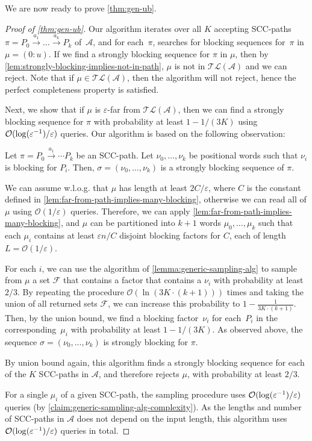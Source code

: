 \documentclass[letterpaper, USenglish, cleveref, autoref, thm-restate, numberwithinsect]{lipics-v2021}
\theoremstyle{theorem}
\theoremstyle{definition}
\newcommand{\Aa}{\mathcal{A}}
\newcommand{\cO}{\mathcal{O}}
\newcommand{\eps}{\varepsilon}
\newcommand{\Ff}{\mathcal{F}}
\newcommand{\SCCpath}{\pi}
\newcommand{\timedlang}[1]{\mathcal{TL}( #1 )}
\newcommand{\timedword}[2]{(#1:#2)}
\newcommand{\twu}{\timedword{0}{u}}
\newcommand{\epslogeps}[1][]
{\ifthenelse{\equal{#1}{}}{\log(\eps^{-1})/\eps}{\log^{ #1 }(\eps^{-1})/\eps}}
\begin{document}
We are now ready to prove \cref{thm:gen-ub}.
\begin{proof}[Proof of \cref{thm:gen-ub}]
	Our algorithm iterates over all $K$ accepting SCC-paths~$\SCCpath = P_0\xrightarrow{a_1}\ldots\xrightarrow{a_k} P_k$ of~$\Aa$, and for each~$\SCCpath$, searches for blocking sequences for~$\SCCpath$ in $\mu = \twu$.
	If we find a strongly blocking sequence for $\SCCpath$ in $\mu$, then by \cref{lem:strongly-blocking-implies-not-in-path}, $\mu$ is not in $\timedlang{\Aa}$ and we can reject.
	Note that if $\mu\in\timedlang{\Aa}$, then the algorithm will not reject, hence the perfect completeness property is satisfied.

	Next, we show that if $\mu$ is $\eps$-far from $\timedlang{\Aa}$, then we can find a strongly blocking sequence for $\SCCpath$ with probability at least $1 - 1/(3K)$ using $\cO(\epslogeps)$ queries.
	Our algorithm is based on the following observation:
	\begin{observation}\label{obs:sbs-from-disj-factors}
		Let $\SCCpath  = P_0 \xrightarrow{a_1} \cdots  P_k$ be an SCC-path.
		Let $\nu_0, \ldots, \nu_k$ be positional words such that $\nu_i$ is blocking for $P_i$.
		Then, $\sigma = (\nu_0, \ldots, \nu_k)$ is a strongly blocking sequence of $\SCCpath$.
	\end{observation}

	We can assume w.l.o.g. that $\mu$ has length at least $2C/\eps$, where $C$ is the constant defined in \cref{lem:far-from-path-implies-many-blocking}, otherwise we can read all of $\mu$ using $\cO(1/\eps)$ queries.
	Therefore, we can apply \cref{lem:far-from-path-implies-many-blocking}, and $\mu$ can be partitioned into $k+1$ words $\mu_0,\ldots,\mu_k$ such that each $\mu_i$ contains at least $\eps n/C$ disjoint blocking factors for $C$, each of length $L = \cO(1/\eps)$.

	For each $i$, we can use the algorithm of \cref{lemma:generic-sampling-alg} to sample from $\mu$ a set $\Ff$ that contains a factor that contains a $\nu_i$ with probability at least $2/3$.
	By repeating the procedure $\cO(\ln(3K\cdot (k+1)))$ times and taking the union of all returned sets $\Ff$, we can increase this probability to $1 - \frac{1}{3K\cdot (k+1)}$.
	Then, by the union bound, we find a blocking factor~$\nu_i$ for each~$P_i$ in the corresponding~$\mu_i$ with probability at least $1 - 1/(3K)$. As observed above, the sequence $\sigma= (\nu_0, \ldots, \nu_k)$ is strongly blocking for $\pi$.

	By union bound again, this algorithm finds a strongly blocking sequence for each of the $K$ SCC-paths in $\Aa$, and therefore rejects $\mu$, with probability at least $2/3$.

	For a single $\mu_i$ of a given SCC-path, the sampling procedure uses $\cO(\epslogeps)$ queries (by \cref{claim:generic-sampling-alg-complexity}).
	As the lengths and number of SCC-paths in $\Aa$ does not depend on the input length, this algorithm uses $\cO(\epslogeps)$ queries in total.
\end{proof}
\end{document}
